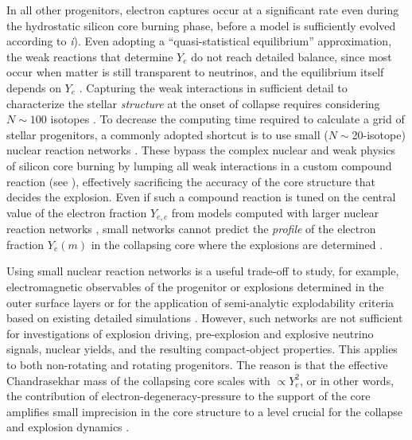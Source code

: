 \documentclass[%
trackchanges,twocolumn]{aastex701}
\begin{document}
In all other progenitors, electron captures occur at a significant
rate even during the hydrostatic silicon core burning phase, %
before a model is sufficiently evolved according to \emph{i}). Even
adopting a ``quasi-statistical equilibrium'' approximation, the weak
reactions that determine $Y_{e}$ do not reach detailed balance, since
most occur when matter is still transparent to neutrinos, and the
equilibrium itself depends on $Y_{e}$ \citep[e.g.,][]{hix:96}.
Capturing the weak interactions in sufficient detail to characterize
the stellar \emph{structure} at the onset of collapse requires
considering $N\sim100$ isotopes \citep[e.g.,][]{farmer:16,
  grichener:25}. To decrease the computing time required to calculate
a grid of stellar progenitors, a commonly adopted shortcut is to use
small ($N\sim$20-isotope) nuclear reaction networks
\citep[e.g.,][]{pols:95, timmes:00, griffiths:25}. These bypass the
complex nuclear and weak physics of silicon core burning by lumping
all weak interactions in a custom compound reaction (see
\citealt{timmes:00, marchant:19, grichener:25}), effectively
sacrificing the accuracy of the core structure that decides the
explosion. Even if such a compound reaction is tuned on the central
value of the electron fraction $Y_{e, c}$ from models computed with
larger nuclear reaction networks
\citep[e.g.,][]{aguilera-dena:18, schneider:21, schneider:24}, small
networks cannot predict the \emph{profile} of the electron fraction
$Y_{e}(m)$ in the collapsing core where the explosions are determined
\citep[e.g.,][]{renzo:24}.

Using small nuclear reaction networks is a useful trade-off to study,
for example, electromagnetic observables of the progenitor or
explosions determined in the outer surface layers
\citep[e.g.,][]{morozova:15,paxton:18,goldberg:19,gilkis:25} or for
the application of semi-analytic explodability criteria based on
existing detailed simulations \citep[e.g.,][]{mueller:16,schneider:24,
  laplace:25,gilkis:26}. However, such networks are not sufficient for
investigations of explosion driving, pre-explosion and explosive
neutrino signals, nuclear yields, and the resulting compact-object
properties. This applies to both non-rotating \citep{farmer:16} and
rotating \citep{renzo:24} progenitors. The reason is that the
effective Chandrasekhar mass of the collapsing core scales with
$\propto Y_{e}^{2}$, or in other words, the contribution of
electron-degeneracy-pressure to the support of the core amplifies
small imprecision in the core structure to a level crucial for the
collapse and explosion dynamics \citep[e.g.,][]{janka:12,
  grichener:25}.
\end{document}
